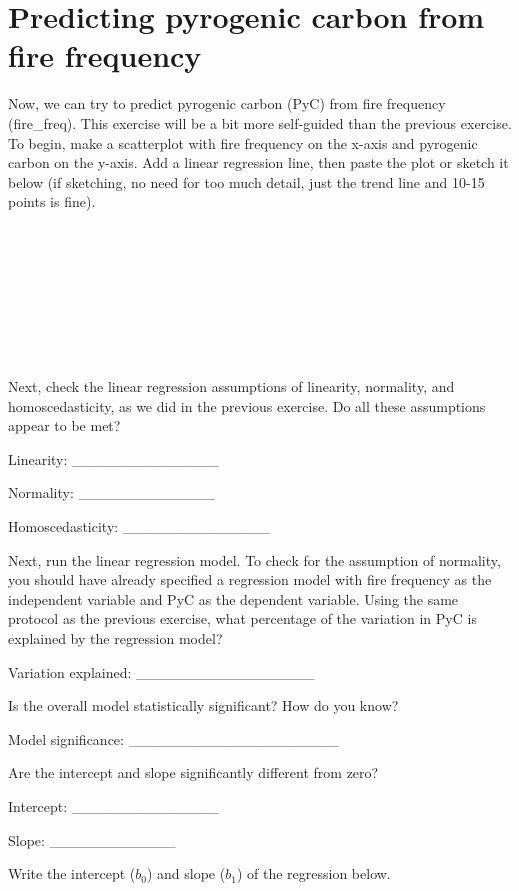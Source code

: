 \documentclass[
]{scrbook}
\begin{document}
\hypertarget{predicting-pyrogenic-carbon-from-fire-frequency}{%
\section{Predicting pyrogenic carbon from fire frequency}\label{predicting-pyrogenic-carbon-from-fire-frequency}}

Now, we can try to predict pyrogenic carbon (PyC) from fire frequency (fire\_freq).
This exercise will be a bit more self-guided than the previous exercise.
To begin, make a scatterplot with fire frequency on the x-axis and pyrogenic carbon on the y-axis.
Add a linear regression line, then paste the plot or sketch it below (if sketching, no need for too much detail, just the trend line and 10-15 points is fine).

\begin{verbatim}








\end{verbatim}

Next, check the linear regression assumptions of linearity, normality, and homoscedasticity, as we did in the previous exercise.
Do all these assumptions appear to be met?

Linearity: \_\_\_\_\_\_\_\_\_\_\_\_\_\_

Normality: \_\_\_\_\_\_\_\_\_\_\_\_\_

Homoscedasticity: \_\_\_\_\_\_\_\_\_\_\_\_\_\_

Next, run the linear regression model.
To check for the assumption of normality, you should have already specified a regression model with fire frequency as the independent variable and PyC as the dependent variable.
Using the same protocol as the previous exercise, what percentage of the variation in PyC is explained by the regression model?

Variation explained: \_\_\_\_\_\_\_\_\_\_\_\_\_\_\_\_\_

Is the overall model statistically significant?
How do you know?

Model significance: \_\_\_\_\_\_\_\_\_\_\_\_\_\_\_\_\_\_\_\_

Are the intercept and slope significantly different from zero?

Intercept: \_\_\_\_\_\_\_\_\_\_\_\_\_\_

Slope: \_\_\_\_\_\_\_\_\_\_\_\_

Write the intercept (\(b_{0}\)) and slope (\(b_{1}\)) of the regression below.
\end{document}
